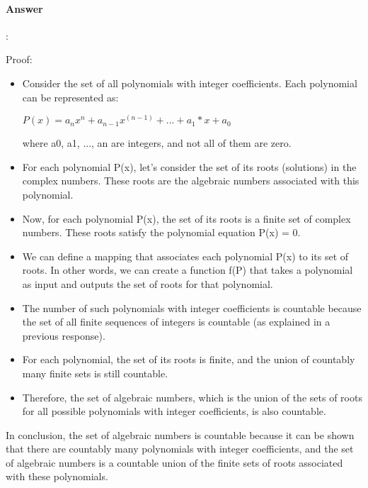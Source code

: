 \documentclass{article}
\begin{document}
\paragraph{Answer}:

Proof:

\begin{itemize}
  \item Consider the set of all polynomials with integer coefficients. Each polynomial can be represented as:

  $P(x) = a_nx^n + a_{n-1}x^(n-1) + ... + a_1*x + a_0$
  
  where a0, a1, ..., an are integers, and not all of them are zero.
  
  \item For each polynomial P(x), let's consider the set of its roots (solutions) in the complex numbers. These roots are the algebraic numbers associated with this polynomial.
  
  \item Now, for each polynomial P(x), the set of its roots is a finite set of complex numbers. These roots satisfy the polynomial equation P(x) = 0.
  
  \item We can define a mapping that associates each polynomial P(x) to its set of roots. In other words, we can create a function f(P) that takes a polynomial as input and outputs the set of roots for that polynomial.
  
  \item The number of such polynomials with integer coefficients is countable because the set of all finite sequences of integers is countable (as explained in a previous response).
  
  \item For each polynomial, the set of its roots is finite, and the union of countably many finite sets is still countable.
  
  \item Therefore, the set of algebraic numbers, which is the union of the sets of roots for all possible polynomials with integer coefficients, is also countable.
\end{itemize}

In conclusion, the set of algebraic numbers is countable because it can be shown that there are countably many polynomials with integer coefficients, and the set of algebraic numbers is a countable union of the finite sets of roots associated with these polynomials.
\end{document}
